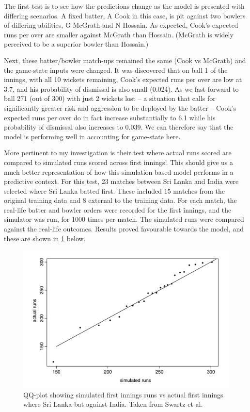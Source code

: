 The first test is to see how the predictions change as the model is presented with differing scenarios. A fixed batter, A Cook in this case, is pit against two bowlers of differing abilities, G McGrath and N Hossain. As expected, Cook’s expected runs per over are smaller against McGrath than Hossain. (McGrath is widely perceived to be a superior bowler than Hossain.)

Next, these batter/bowler match-ups remained the same (Cook vs McGrath) and the game-state inputs were changed. It was discovered that on ball 1 of the innings, with all 10 wickets remaining, Cook’s expected runs per over are low at 3.7, and his probability of dismissal is also small (0.024). As we fast-forward to ball 271 (out of 300) with just 2 wickets lost – a situation that calls for significantly greater risk and aggression to be deployed by the batter – Cook’s expected runs per over do in fact increase substantially to 6.1 while his probability of dismissal also increases to 0.039. We can therefore say that the model is performing well in accounting for game-state here.

More pertinent to my investigation is their test where actual runs scored are compared to simulated runs scored across first innings’. This should give us a much better representation of how this simulation-based model performs in a predictive context. For this test, 23 matches between Sri Lanka and India were selected where Sri Lanka batted first. These included 15 matches from the original training data and 8 external to the training data.  For each match, the real-life batter and bowler orders were recorded for the first innings, and the simulator was run, for 1000 times per match. The simulated runs were compared against the real-life outcomes. Results proved favourable towards the model, and these are shown in \cref{fig:swartz3} below.

\begin{figure}[h]
    \centering
    \includegraphics{images/swartz3.png}
    \caption{QQ-plot showing simulated first innings runs vs actual first innings where Sri Lanka bat against India. Taken from Swartz et al.}
    \label{fig:swartz3}
\end{figure}

